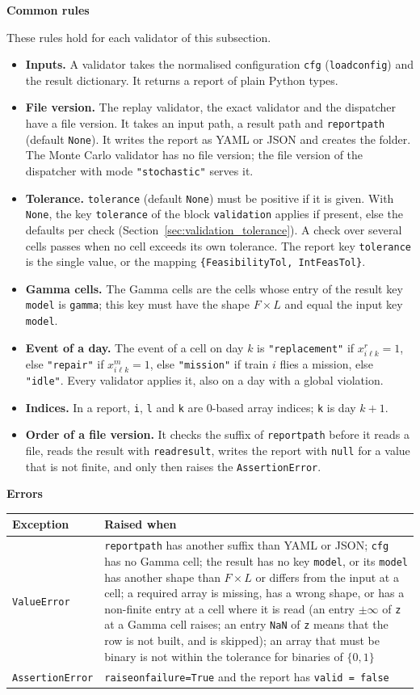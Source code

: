 \documentclass[11pt,a4paper]{article}
\makeatletter
\theoremstyle{plain}
\theoremstyle{definition}
\newcommand{\blockhead}[1]{\par\noindent\textbf{#1}\par\nobreak}
\renewcommand{\_}{\textunderscore\allowbreak{}}
\providecommand{\rejrow}[2]{{\raggedright #1\par} & {\raggedright #2\par} \\}
\providecommand{\tabstart}[2]{\begingroup\small\begin{longtable}{@{}#1@{}}\toprule #2 \\ \midrule \endhead}
\providecommand{\tabend}{\bottomrule\end{longtable}\endgroup}
\makeatother
\begin{document}
\blockhead{Common rules}
These rules hold for each validator of this subsection.
\begin{itemize}[nosep]
  \item \textbf{Inputs.} A validator takes the normalised configuration \texttt{cfg} (\texttt{load\_config}) and the result dictionary. It returns a report of plain Python types.
  \item \textbf{File version.} The replay validator, the exact validator and the dispatcher have a file version. It takes an input path, a result path and \texttt{report\_path} (default \texttt{None}). It writes the report as YAML or JSON and creates the folder. The Monte Carlo validator has no file version; the file version of the dispatcher with mode \texttt{"stochastic"} serves it.
  \item \textbf{Tolerance.} \texttt{tolerance} (default \texttt{None}) must be positive if it is given. With \texttt{None}, the key \texttt{tolerance} of the block \texttt{validation} applies if present, else the defaults per check (Section~\ref{sec:validation_tolerance}). A check over several cells passes when no cell exceeds its own tolerance. The report key \texttt{tolerance} is the single value, or the mapping \texttt{\{FeasibilityTol, IntFeasTol\}}.
  \item \textbf{Gamma cells.} The Gamma cells are the cells whose entry of the result key \texttt{model} is \texttt{gamma}; this key must have the shape $F \times L$ and equal the input key \texttt{model}.
  \item \textbf{Event of a day.} The event of a cell on day $k$ is \texttt{"replacement"} if $x^r_{i\ell k} = 1$, else \texttt{"repair"} if $x^m_{i\ell k} = 1$, else \texttt{"mission"} if train $i$ flies a mission, else \texttt{"idle"}. Every validator applies it, also on a day with a global violation.
  \item \textbf{Indices.} In a report, \texttt{i}, \texttt{l} and \texttt{k} are 0-based array indices; \texttt{k} is day $k+1$.
  \item \textbf{Order of a file version.} It checks the suffix of \texttt{report\_path} before it reads a file, reads the result with \texttt{read\_result}, writes the report with \texttt{null} for a value that is not finite, and only then raises the \texttt{AssertionError}.
\end{itemize}

\blockhead{Errors}
\tabstart{p{3.4cm}p{11.6cm}}{Exception & Raised when}
\rejrow{\texttt{ValueError}}{\texttt{report\_path} has another suffix than YAML or JSON; \texttt{cfg} has no Gamma cell; the result has no key \texttt{model}, or its \texttt{model} has another shape than $F \times L$ or differs from the input at a cell; a required array is missing, has a wrong shape, or has a non-finite entry at a cell where it is read (an entry $\pm\infty$ of \texttt{z} at a Gamma cell raises; an entry \texttt{NaN} of \texttt{z} means that the row is not built, and is skipped); an array that must be binary is not within the tolerance for binaries of $\{0,1\}$}
\rejrow{\texttt{AssertionError}}{\texttt{raise\_on\_failure=True} and the report has \texttt{valid = false}}
\tabend
\end{document}
